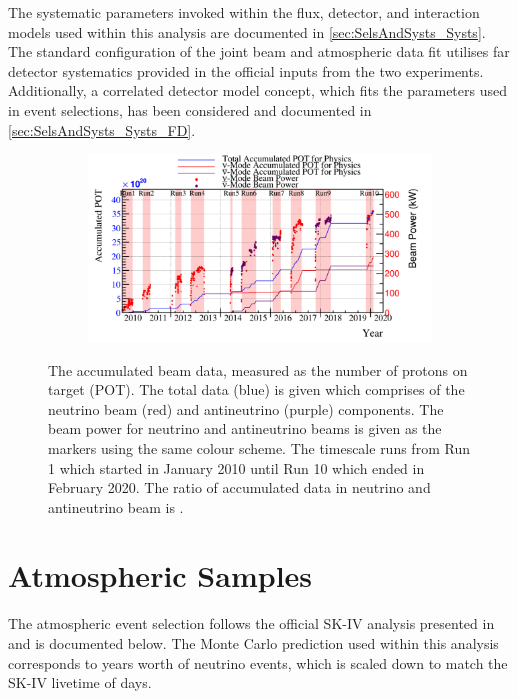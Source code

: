 The systematic parameters invoked within the flux, detector, and interaction models used within this analysis are documented in \autoref{sec:SelsAndSysts_Systs}. The standard configuration of the joint beam and atmospheric data fit utilises far detector systematics provided in the official inputs from the two experiments. Additionally, a correlated detector model concept, which fits the parameters used in event selections, has been considered and documented in \autoref{sec:SelsAndSysts_Systs_FD}.

\begin{figure}[h]
  \begin{subfigure}[t]{\textwidth}
    \includegraphics[width=\textwidth, trim={0mm 0mm 0mm 0mm}, clip,page=1]{Figures/Selections/BeamPowerAndPOT.pdf}
  \end{subfigure}
  \caption{The accumulated beam data, measured as the number of protons on target (POT). The total data (blue) is given which comprises of the neutrino beam (red) and antineutrino (purple) components. The beam power for neutrino and antineutrino beams is given as the markers using the same colour scheme. The timescale runs from Run 1 which started in January 2010 until Run 10 which ended in February 2020. The ratio of accumulated data in neutrino and antineutrino beam is .}
  \label{fig:SelsAndSysts_Beam_PowerAndPOT}
\end{figure}

\newpage
\section{Atmospheric Samples}
\label{sec:SelsAndSysts_Sels_Atms}

The atmospheric event selection follows the official SK-IV analysis presented in \cite{Jiang2019-iw} and is documented below. The Monte Carlo prediction used within this analysis corresponds to  years worth of neutrino events, which is scaled down to match the SK-IV livetime of  days.

